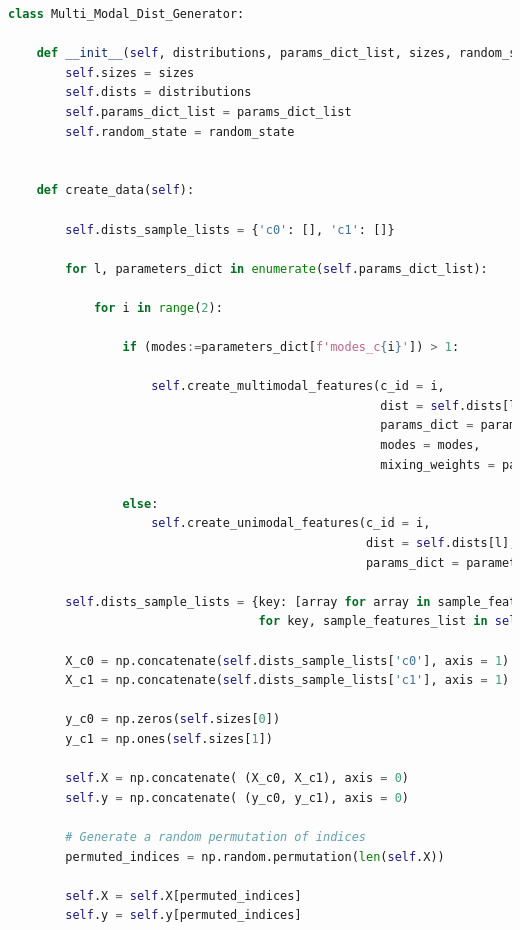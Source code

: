 \begin{lstlisting}[language=Python, numbers=none]
class Multi_Modal_Dist_Generator:
    
    def __init__(self, distributions, params_dict_list, sizes, random_state = 1234):
        self.sizes = sizes
        self.dists = distributions
        self.params_dict_list = params_dict_list
        self.random_state = random_state


    def create_data(self):
        
        self.dists_sample_lists = {'c0': [], 'c1': []}
        
        for l, parameters_dict in enumerate(self.params_dict_list):

            for i in range(2):

                if (modes:=parameters_dict[f'modes_c{i}']) > 1:
                    
                    self.create_multimodal_features(c_id = i, 
                                                    dist = self.dists[l], 
                                                    params_dict = parameters_dict[f'params_c{i}'], 
                                                    modes = modes, 
                                                    mixing_weights = parameters_dict[f'mixing_weights_c{i}'])

                else:
                    self.create_unimodal_features(c_id = i, 
                                                  dist = self.dists[l], 
                                                  params_dict = parameters_dict[f'params_c{i}'] )
        
        self.dists_sample_lists = {key: [array for array in sample_features_list]
                                   for key, sample_features_list in self.dists_sample_lists.items()}
        
        X_c0 = np.concatenate(self.dists_sample_lists['c0'], axis = 1)
        X_c1 = np.concatenate(self.dists_sample_lists['c1'], axis = 1)

        y_c0 = np.zeros(self.sizes[0])
        y_c1 = np.ones(self.sizes[1])

        self.X = np.concatenate( (X_c0, X_c1), axis = 0)
        self.y = np.concatenate( (y_c0, y_c1), axis = 0)

        # Generate a random permutation of indices
        permuted_indices = np.random.permutation(len(self.X))

        self.X = self.X[permuted_indices]
        self.y = self.y[permuted_indices]
                


\end{lstlisting}
